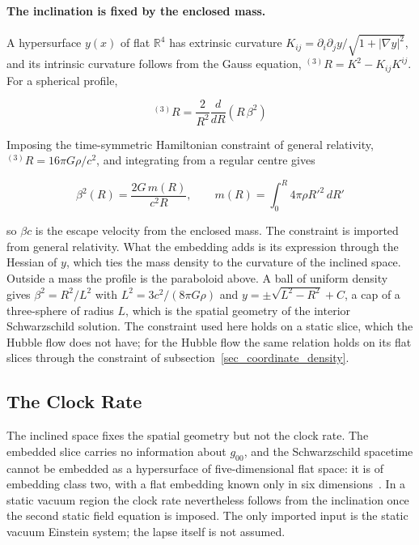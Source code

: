 \documentclass[anonymous]{iopjournal}
\begin{document}
\paragraph{The inclination is fixed by the enclosed mass.} A hypersurface $y(x)$ of flat $\mathbb{R}^4$ has extrinsic curvature $K_{ij}=\partial_i\partial_j y/\sqrt{1+|\nabla y|^2}$, and its intrinsic curvature follows from the Gauss equation, ${}^{(3)}\!R=K^2-K_{ij}K^{ij}$. For a spherical profile,

\begin{equation}\label{eq_gauss_radial}
    {}^{(3)}\!R=\frac{2}{R^2}\frac{d}{dR}\left(R\,\beta^2\right)
\end{equation}

Imposing the time-symmetric Hamiltonian constraint of general relativity, ${}^{(3)}\!R=16\pi G\rho/c^2$, and integrating from a regular centre gives

\begin{equation}\label{eq_beta_enclosed}
    \beta^2(R)=\frac{2G\,m(R)}{c^2R},
    \qquad
    m(R)=\int_0^R4\pi\rho R'^2\,dR'
\end{equation}

so $\beta c$ is the escape velocity from the enclosed mass. The constraint is imported from general relativity. What the embedding adds is its expression through the Hessian of $y$, which ties the mass density to the curvature of the inclined space. Outside a mass the profile is the paraboloid above. A ball of uniform density gives $\beta^2=R^2/L^2$ with $L^2=3c^2/(8\pi G\rho)$ and $y=\pm\sqrt{L^2-R^2}+C$, a cap of a three-sphere of radius $L$, which is the spatial geometry of the interior Schwarzschild solution. The constraint used here holds on a static slice, which the Hubble flow does not have; for the Hubble flow the same relation holds on its flat slices through the constraint of subsection~\ref{sec_coordinate_density}.

\subsection{The Clock Rate}\label{sec_lapse_derivation}

The inclined space fixes the spatial geometry but not the clock rate. The embedded slice carries no information about $g_{00}$, and the Schwarzschild spacetime cannot be embedded as a hypersurface of five-dimensional flat space: it is of embedding class two, with a flat embedding known only in six dimensions~\cite{Kasner1921}. In a static vacuum region the clock rate nevertheless follows from the inclination once the second static field equation is imposed. The only imported input is the static vacuum Einstein system; the lapse itself is not assumed.
\end{document}
